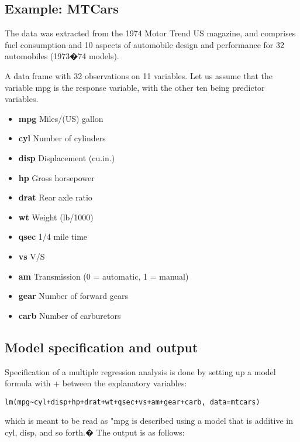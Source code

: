 
\subsection{Example: MTCars}
The data was extracted from the 1974 Motor Trend US magazine, and comprises fuel consumption and 10 aspects of automobile design and performance for 32 automobiles (1973�74 models).

A data frame with 32 observations on 11 variables. Let
us assume that the variable mpg is the response variable, with the other ten being predictor variables.

\begin{itemize}
\item  \textbf{mpg}  Miles/(US) gallon
\item  \textbf{cyl}  Number of cylinders
\item  \textbf{disp}  Displacement (cu.in.)
\item  \textbf{hp}  Gross horsepower
\item  \textbf{drat}  Rear axle ratio
\item  \textbf{wt}  Weight (lb/1000)
\item  \textbf{qsec}  1/4 mile time
\item  \textbf{vs}  V/S
\item  \textbf{am}  Transmission (0 = automatic, 1 = manual)
\item  \textbf{gear}  Number of forward gears
\item  \textbf{carb}  Number of carburetors
\end{itemize}

\subsection{Model specification and output}
Specification of a multiple regression analysis is done by setting up a
model formula with + between the explanatory variables:
\begin{verbatim}
lm(mpg~cyl+disp+hp+drat+wt+qsec+vs+am+gear+carb, data=mtcars)
\end{verbatim}

which is meant to be read as "mpg is described using a model that
is additive in cyl, disp, and so forth.� The output is as follows:

